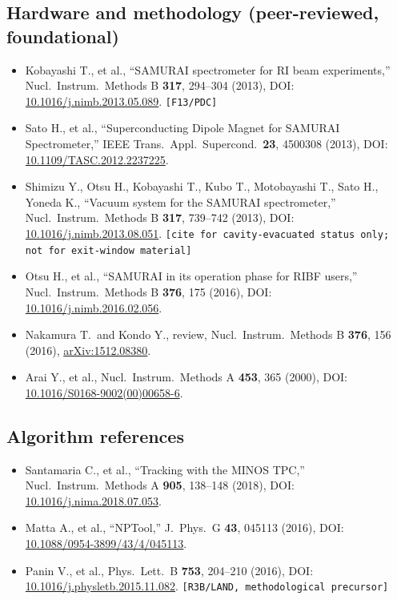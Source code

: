\documentclass[a4paper, 11pt]{article}
\begin{document}
\subsection{Hardware and methodology (peer-reviewed, foundational)}
\begin{itemize}
  \item Kobayashi T., et al., ``SAMURAI spectrometer for RI beam experiments,'' Nucl.\ Instrum.\ Methods B \textbf{317}, 294--304 (2013), DOI: \href{https://doi.org/10.1016/j.nimb.2013.05.089}{10.1016/j.nimb.2013.05.089}. \texttt{[F13/PDC]}
  \item Sato H., et al., ``Superconducting Dipole Magnet for SAMURAI Spectrometer,'' IEEE Trans.\ Appl.\ Supercond.\ \textbf{23}, 4500308 (2013), DOI: \href{https://doi.org/10.1109/TASC.2012.2237225}{10.1109/TASC.2012.2237225}.
  \item Shimizu Y., Otsu H., Kobayashi T., Kubo T., Motobayashi T., Sato H., Yoneda K., ``Vacuum system for the SAMURAI spectrometer,'' Nucl.\ Instrum.\ Methods B \textbf{317}, 739--742 (2013), DOI: \href{https://doi.org/10.1016/j.nimb.2013.08.051}{10.1016/j.nimb.2013.08.051}. \texttt{[cite for cavity-evacuated status only; not for exit-window material]}
  \item Otsu H., et al., ``SAMURAI in its operation phase for RIBF users,'' Nucl.\ Instrum.\ Methods B \textbf{376}, 175 (2016), DOI: \href{https://doi.org/10.1016/j.nimb.2016.02.056}{10.1016/j.nimb.2016.02.056}.
  \item Nakamura T.\ and Kondo Y., review, Nucl.\ Instrum.\ Methods B \textbf{376}, 156 (2016), \href{https://arxiv.org/abs/1512.08380}{arXiv:1512.08380}.
  \item Arai Y., et al., Nucl.\ Instrum.\ Methods A \textbf{453}, 365 (2000), DOI: \href{https://doi.org/10.1016/S0168-9002(00)00658-6}{10.1016/S0168-9002(00)00658-6}.
\end{itemize}

\subsection{Algorithm references}
\begin{itemize}
  \item Santamaria C., et al., ``Tracking with the MINOS TPC,'' Nucl.\ Instrum.\ Methods A \textbf{905}, 138--148 (2018), DOI: \href{https://doi.org/10.1016/j.nima.2018.07.053}{10.1016/j.nima.2018.07.053}.
  \item Matta A., et al., ``NPTool,'' J.\ Phys.\ G \textbf{43}, 045113 (2016), DOI: \href{https://doi.org/10.1088/0954-3899/43/4/045113}{10.1088/0954-3899/43/4/045113}.
  \item Panin V., et al., Phys.\ Lett.\ B \textbf{753}, 204--210 (2016), DOI: \href{https://doi.org/10.1016/j.physletb.2015.11.082}{10.1016/j.physletb.2015.11.082}. \texttt{[R3B/LAND, methodological precursor]}
\end{itemize}
\end{document}
